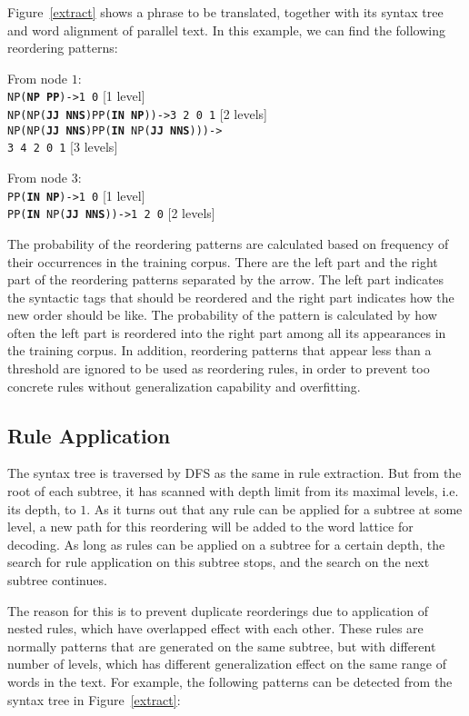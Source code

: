 \documentclass[a4paper]{article}
\begin{document}
Figure~\ref{extract} shows a phrase to be translated, together with its syntax tree and word alignment of parallel text. In this example, we can find the following reordering patterns:\bigskip

\noindent From node $1$:\\
\texttt{NP(\textbf{NP} \textbf{PP})->1 0} \hfill [1 level]\hphantom{s}\\
\texttt{NP(NP(\textbf{JJ} \textbf{NNS})PP(\textbf{IN} \textbf{NP}))->3 2 0 1} \hfill [2 levels]\\
\texttt{NP(NP(\textbf{JJ} \textbf{NNS})PP(\textbf{IN} NP(\textbf{JJ} \textbf{NNS})))-> \\ 3 4 2 0 1} \hfill [3 levels]\medskip

\noindent From node $3$:\\
\texttt{PP(\textbf{IN} \textbf{NP})->1 0} \hfill [1 level]\hphantom{s}\\
\texttt{PP(\textbf{IN} NP(\textbf{JJ} \textbf{NNS}))->1 2 0} \hfill [2 levels]\bigskip

The probability of the reordering patterns are calculated based on frequency of their occurrences in the training corpus. There are the left part and the right part of the reordering patterns separated by the arrow. The left part indicates the syntactic tags that should be reordered and the right part indicates how the new order should be like. The probability of the pattern is calculated by how often the left part is reordered into the right part among all its appearances in the training corpus. In addition, reordering patterns that appear less than a threshold are ignored to be used as reordering rules, in order to prevent too concrete rules without generalization capability and overfitting.

\subsection{Rule Application}

The syntax tree is traversed by DFS as the same in rule extraction. But from the root of each subtree, it has scanned with depth limit from its maximal levels, i.e. its depth, to $1$. As it turns out that any rule can be applied for a subtree at some level, a new path for this reordering will be added to the word lattice for decoding. As long as rules can be applied on a subtree for a certain depth, the search for rule application on this subtree stops, and the search on the next subtree continues.

The reason for this is to prevent duplicate reorderings due to application of nested rules, which have overlapped effect with each other. These rules are normally patterns that are generated on the same subtree, but with different number of levels, which has different generalization effect on the same range of words in the text. For example, the following patterns can be detected from the syntax tree in Figure~\ref{extract}:\bigskip
\end{document}
